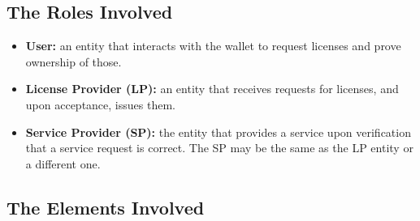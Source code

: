 \subsection{The Roles Involved} 

\begin{itemize}
    \item \textbf{User:} an entity that interacts with the wallet to request licenses and prove ownership of those.
    \item \textbf{License Provider (LP):} an entity that receives requests for licenses, and upon acceptance, issues them.
    \item \textbf{Service Provider (SP):} the entity that provides a service upon verification that a service request is correct. The SP may be the same as the LP entity or a different one.
\end{itemize}

\subsection{The Elements Involved} 

